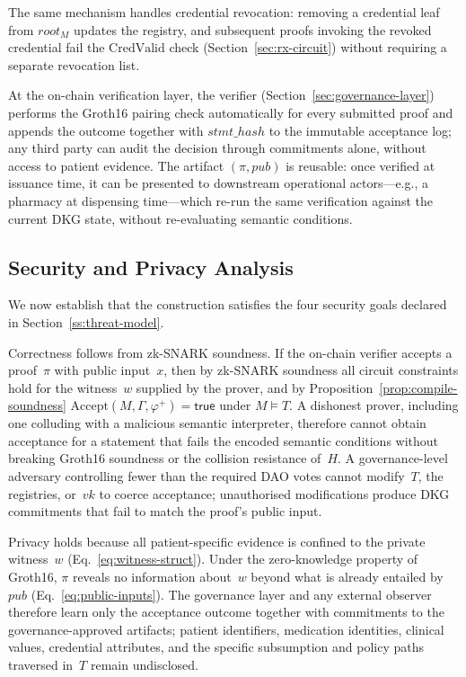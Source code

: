 \documentclass[journal]{IEEEtran}
\begin{document}
The same mechanism handles credential revocation: removing
a credential leaf from $\mathit{root}_M$ updates the
registry, and subsequent proofs invoking the revoked
credential fail the $\mathrm{CredValid}$ check
(Section~\ref{sec:rx-circuit}) without requiring a separate
revocation list.

At the on-chain verification layer, the verifier
(Section~\ref{sec:governance-layer}) performs the Groth16
pairing check automatically for every submitted proof and
appends the outcome together with $\mathit{stmt\_hash}$ to
the immutable acceptance log; any third party can audit the
decision through commitments alone, without access to
patient evidence.
The artifact $(\pi,\mathit{pub})$ is reusable: once verified
at issuance time, it can be presented to downstream
operational actors---e.g., a pharmacy at dispensing
time---which re-run the same verification against the
current DKG state, without re-evaluating semantic
conditions.

\subsection{Security and Privacy Analysis}
\label{sec:security-privacy-analysis}

We now establish that the construction satisfies the four
security goals declared in
Section~\ref{ss:threat-model}.

Correctness follows from zk-SNARK soundness.
If the on-chain verifier accepts a proof~$\pi$ with public
input~$x$, then by zk-SNARK soundness all circuit constraints
hold for the witness~$w$ supplied by the prover, and by
Proposition~\ref{prop:compile-soundness}
$\mathrm{Accept}(M,\Gamma,\varphi^{+})=\mathsf{true}$ under
$M \models T$.
A dishonest prover, including one colluding with a malicious
semantic interpreter, therefore cannot obtain acceptance for
a statement that fails the encoded semantic conditions
without breaking Groth16 soundness or the collision
resistance of~$H$.
A governance-level adversary controlling fewer than the
required DAO votes cannot modify~$T$, the registries,
or~$\mathit{vk}$ to coerce acceptance; unauthorised
modifications produce DKG commitments that fail to match the
proof's public input.

Privacy holds because all patient-specific evidence is
confined to the private witness~$w$
(Eq.~\ref{eq:witness-struct}).
Under the zero-knowledge property of Groth16, $\pi$ reveals
no information about~$w$ beyond what is already entailed by
$\mathit{pub}$ (Eq.~\ref{eq:public-inputs}).
The governance layer and any external observer therefore
learn only the acceptance outcome together with commitments
to the governance-approved artifacts; patient identifiers,
medication identities, clinical values, credential
attributes, and the specific subsumption and policy paths
traversed in~$T$ remain undisclosed.
\end{document}
